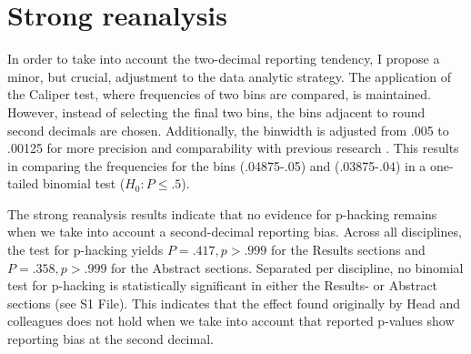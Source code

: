 \section{Strong reanalysis}
In order to take into account the two-decimal reporting tendency, I propose a minor, but crucial, adjustment to the data analytic strategy. The application of the Caliper test, where frequencies of two bins are compared, is maintained. However, instead of selecting the final two bins, the bins adjacent to round second decimals are chosen. Additionally, the binwidth is adjusted from .005 to .00125 for more precision and comparability with previous research \cite{Masicampo2012, Leggett2013}. This results in comparing the frequencies for the bins (.04875-.05) and (.03875-.04) in a one-tailed binomial test ($H_0: P \leq .5$).

The strong reanalysis results indicate that no evidence for p-hacking remains when we take into account a second-decimal reporting bias. Across all disciplines, the test for p-hacking yields $P=.417,p>.999$ for the Results sections and $P=.358,p>.999$ for the Abstract sections. Separated per discipline, no binomial test for p-hacking is statistically significant in either the Results- or Abstract sections (see S1 File). This indicates that the effect found originally by Head and colleagues does not hold when we take into account that reported p-values show reporting bias at the second decimal.